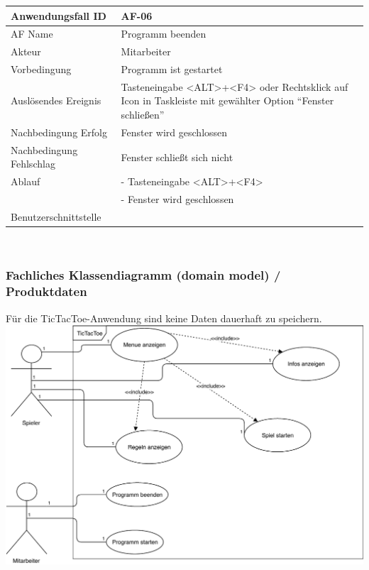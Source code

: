 \documentclass[12pt]{article}
\begin{document}
\begin{tabularx}{\textwidth}{|l|X|} \hline
Anwendungsfall ID&AF-06\\ \hline
AF Name&Programm beenden\\ \hline
Akteur&Mitarbeiter\\ \hline
Vorbedingung&Programm ist gestartet\\ \hline
Auslösendes Ereignis&Tasteneingabe <ALT>+<F4> oder Rechtsklick auf \Gls{Icon} in Taskleiste mit gewählter Option "`Fenster schließen"'\\ \hline
Nachbedingung Erfolg&Fenster wird geschlossen\\ \hline
Nachbedingung Fehlschlag&Fenster schließt sich nicht\\ \hline
Ablauf&- Tasteneingabe <ALT>+<F4>\\&- Fenster wird geschlossen\\ \hline
Benutzerschnittstelle&\\ \hline
\end{tabularx}\\

\newpage
\subsubsection{Fachliches Klassendiagramm (domain model) / Produktdaten}
Für die \Gls{TicTacToe}-Anwendung sind keine Daten dauerhaft zu speichern. \\
\includegraphics[scale=0.9]{Anwendungsfalldiagramm.pdf}\\
\end{document}
